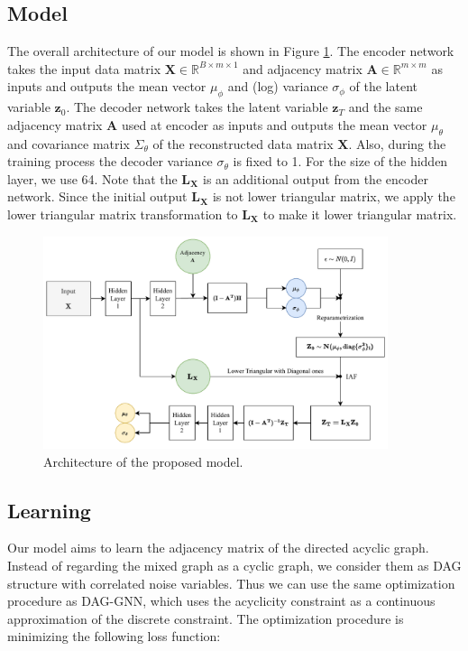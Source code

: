 \documentclass[10pt]{article}
\begin{document}
\subsection{Model}

The overall architecture of our model is shown in Figure \ref*{diagram}. The encoder network takes the input data matrix $\mathbf{X}\in \mathbb{R}^{B \times m \times 1}$ and adjacency matrix $\mathbf{A}\in \mathbb{R}^{m \times m}$ as inputs and outputs the mean vector $\mu_\phi$ and (log) variance $\sigma_\phi$ of the latent variable $\mathbf{z}_0$. The decoder network takes the latent variable $\mathbf{z}_T$ and the same adjacency matrix $\mathbf{A}$ used at encoder as inputs and outputs the mean vector $\mu_\theta$ and covariance matrix $\Sigma_\theta$ of the reconstructed data matrix $\mathbf{X}$. Also, during the training process the decoder variance $\sigma_\theta$ is fixed to 1. For the size of the hidden layer, we use 64. Note that the $\mathbf{L_X}$ is an additional output from the encoder network. Since the initial output $\mathbf{L_X}$ is not lower triangular matrix, we apply the lower triangular matrix transformation to $\mathbf{L_X}$ to make it lower triangular matrix.

\begin{figure}[H]
    \centering
    \includegraphics[width=0.9\textwidth]{fig/model.pdf}
    \caption{Architecture of the proposed model.}
    \label{diagram}
\end{figure}

\subsection{Learning}

Our model aims to learn the adjacency matrix of the directed acyclic graph. Instead of regarding the mixed graph as a cyclic graph, we consider them as DAG structure with correlated noise variables. Thus we can use the same optimization procedure as DAG-GNN, which uses the acyclicity constraint as a continuous approximation of the discrete constraint. The optimization procedure is minimizing the following loss function:
\end{document}
